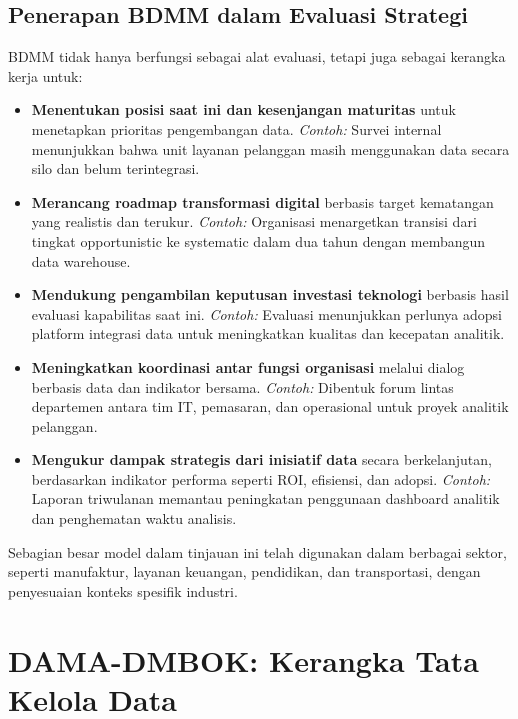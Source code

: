 \subsection{Penerapan BDMM dalam Evaluasi Strategi}

BDMM tidak hanya berfungsi sebagai alat evaluasi, tetapi juga sebagai kerangka kerja untuk:

\begin{itemize}
	\item \textbf{Menentukan posisi saat ini dan kesenjangan maturitas} untuk menetapkan prioritas pengembangan data. \textit{Contoh:} Survei internal menunjukkan bahwa unit layanan pelanggan masih menggunakan data secara silo dan belum terintegrasi.
	
	\item \textbf{Merancang roadmap transformasi digital} berbasis target kematangan yang realistis dan terukur. \textit{Contoh:} Organisasi menargetkan transisi dari tingkat opportunistic ke systematic dalam dua tahun dengan membangun data warehouse.
	
	\item \textbf{Mendukung pengambilan keputusan investasi teknologi} berbasis hasil evaluasi kapabilitas saat ini. \textit{Contoh:} Evaluasi menunjukkan perlunya adopsi platform integrasi data untuk meningkatkan kualitas dan kecepatan analitik.
	
	\item \textbf{Meningkatkan koordinasi antar fungsi organisasi} melalui dialog berbasis data dan indikator bersama. \textit{Contoh:} Dibentuk forum lintas departemen antara tim IT, pemasaran, dan operasional untuk proyek analitik pelanggan.
	
	\item \textbf{Mengukur dampak strategis dari inisiatif data} secara berkelanjutan, berdasarkan indikator performa seperti ROI, efisiensi, dan adopsi. \textit{Contoh:} Laporan triwulanan memantau peningkatan penggunaan dashboard analitik dan penghematan waktu analisis.
\end{itemize}


Sebagian besar model dalam tinjauan ini telah digunakan dalam berbagai sektor, seperti manufaktur, layanan keuangan, pendidikan, dan transportasi, dengan penyesuaian konteks spesifik industri.


\section{DAMA-DMBOK: Kerangka Tata Kelola Data}

